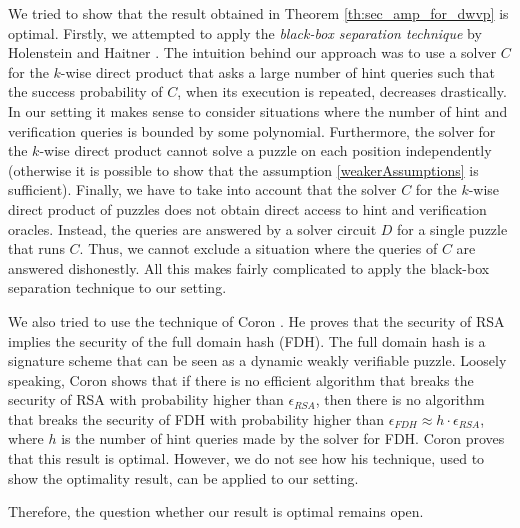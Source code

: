 We tried to show that the result obtained in Theorem \ref{th:sec_amp_for_dwvp} is optimal.
Firstly, we attempted to apply the \textit{black-box separation technique} by Holenstein and Haitner \cite{haitner2009possibility}.
The intuition behind our approach was to use a solver $C$ for the $k$-wise direct product that asks a large number of hint queries such that
the success probability of $C$, when its execution is repeated, decreases drastically.
In our setting it makes sense to consider situations where the number of hint and verification queries is bounded by some polynomial.
Furthermore, the solver for the $k$-wise direct product cannot solve a puzzle on each position independently
(otherwise it is possible to show that the assumption \eqref{weakerAssumptions} is sufficient).
Finally, we have to take into account that the solver $C$ for the $k$-wise direct product of puzzles does not obtain direct access to hint and verification oracles.
Instead, the queries are answered by a solver circuit $D$ for a single puzzle that runs $C$. Thus, we cannot exclude a situation where the queries of $C$
are answered dishonestly. All this makes fairly complicated to apply the black-box separation technique to our setting.

We also tried to use the technique of Coron \cite{coron2000exact, coron2002optimal}.
He proves that the security of RSA implies the security of the full domain hash (FDH).
The full domain hash is a signature scheme that can be seen as a dynamic weakly verifiable puzzle.
Loosely speaking, Coron shows that if there is no efficient algorithm that breaks the security of RSA with probability higher
than $\epsilon_{\mathit{RSA}}$, then there is no algorithm that breaks the security of FDH with probability higher than
$\epsilon_{\mathit{FDH}} \approx h \cdot \epsilon_{\mathit{RSA}}$, where $h$ is the number of hint queries made by the solver for FDH.
Coron proves that this result is optimal. However, we do not see how his technique, used to show the optimality result, can be applied to our setting.

Therefore, the question whether our result is optimal remains open.


